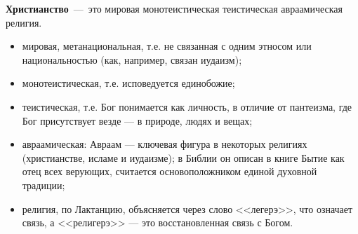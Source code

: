 \textbf{Христианство}~---~это мировая монотеистическая теистическая авраамическая религия.

\begin{itemize}
    \item мировая, метанациональная, т.е. не связанная с одним этносом или национальностью (как, например, связан иудаизм);
    \item монотеистическая, т.е. исповедуется единобожие;
    \item теистическая, т.е. Бог понимается как личность, в отличие от пантеизма, где  Бог присутствует везде --- в природе, людях и вещах;
    \item авраамическая: Авраам --- ключевая фигура в некоторых религиях (христианстве, исламе и иудаизме); в Библии он описан в книге Бытие как отец всех верующих, считается основоположником единой духовной традиции;
    \item религия, по Лактанцию, объясняется через слово <<легерэ>>, что означает связь, а <<религерэ>> --- это восстановленная связь с Богом.
\end{itemize}



